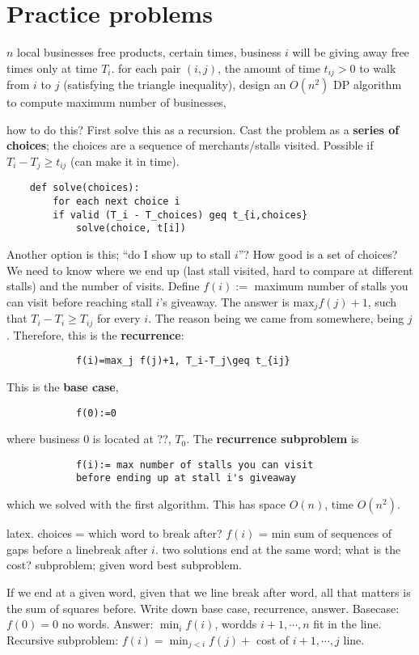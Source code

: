 \section{Practice problems} 
 \begin{prob}
     $n $ local businesses free products, certain times, business $i$ will be giving away free times only at time $T_i $. for each pair $(i,j)$, the amount of time $t_{ij}>0$ to walk from $i$ to $j$ (satisfying the triangle inequality), design an $O(n^2)$ DP algorithm to compute maximum number of businesses,
\end{prob}
\begin{solution}
    how to do this? First solve this as a recursion. Cast the problem as a \textbf{series of choices}; the choices are a sequence of merchants/stalls visited. Possible if $T_i -T_j  \geq t_{ij}$ (can make it in time). 

\begin{verbatim}
    def solve(choices):
        for each next choice i
        if valid (T_i - T_choices) geq t_{i,choices}  
            solve(choice, t[i])
        \end{verbatim}Another option is this; ``do I show up to stall $i$''? How good is a set of choices? We need to know where we end up (last stall visited, hard to compare at different stalls) and the number of visits. Define $f(i):=$ maximum number of stalls you can visit before reaching stall $i$'s giveaway. The answer is $\mathrm{max}_j f(j)+1$, such that $T_i  -T_i  \geq T_{ij}$ for every $i$. The reason being we came from somewhere, being $j$. Therefore, this is the \textbf{recurrence}:
        \begin{verbatim}
            f(i)=max_j f(j)+1, T_i-T_j\geq t_{ij} 
        \end{verbatim}This is the \textbf{base case},
        \begin{verbatim}
            f(0):=0
        \end{verbatim}where business 0 is located at ??, $T_0 $. The \textbf{recurrence subproblem} is 
        \begin{verbatim}
            f(i):= max number of stalls you can visit 
            before ending up at stall i's giveaway
        \end{verbatim}which we solved with the first algorithm. This has space $O(n)$, time $O(n^2)$.
\end{solution}
\begin{solution}
    latex. choices = which word to break after? $f(i)$ = min sum of sequences of gaps before a linebreak after $i$. two solutions end at the same word; what is the cost? subproblem; given word best subproblem.

    If we end at a given word, given that we line break after word, all that matters is the sum of squares before. Write down base case, recurrence, answer. Basecase: $f(0)=0$ no words. Answer: $\min_i f(i)$, wordds $i+1, \cdots ,n$ fit in the line. Recursive subproblem: $f(i)=\min_{j<i} f(j)+$ cost of $i+1 ,\cdots , j$ line.
\end{solution}

